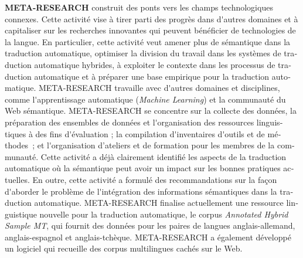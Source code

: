\begin{french}
\begin{multicols}{2}
\textbf{META-RESEARCH} construit des ponts vers les champs technologiques connexes. Cette activité vise à tirer parti des progrès dans d{\mbox '}autres domaines et à capitaliser sur les recherches innovantes qui peuvent bénéficier de technologies de la langue. En particulier, cette activité veut amener plus de sémantique dans la traduction automatique, optimiser la division du travail dans les systèmes de traduction automatique hybrides, à exploiter le contexte dans les processus de traduction automatique et à préparer une base empirique pour la traduction automatique. META-RESEARCH travaille avec d{\mbox '}autres domaines et disciplines, comme l{\mbox '}apprentissage automatique ({\it Machine Learning}) et la communauté du Web sémantique. META-RESEARCH se concentre sur la collecte des données, la préparation des ensembles de données et l{\mbox '}organisation des ressources linguistiques à des fins d{\mbox '}évaluation ; la compilation d{\mbox '}inventaires d{\mbox '}outils et de méthodes~; et l{\mbox '}organisation d'ateliers et de formation pour les membres de la communauté. Cette activité a déjà clairement identifié les aspects de la traduction automatique où la sémantique peut avoir un impact sur les bonnes pratiques actuelles. En outre, cette activité a formulé des recommandations sur la façon d{\mbox '}aborder le problème de l{\mbox '}intégration des informations sémantiques dans la traduction automatique. META-RESEARCH finalise actuellement une ressource linguistique nouvelle pour la traduction automatique, le corpus {\it Annotated Hybrid Sample MT}, qui fournit des données pour les paires de langues anglais-allemand, anglais-espagnol et anglais-tchèque. META-RESEARCH a également développé un logiciel qui recueille des corpus multilingues cachés sur le Web.
\end{multicols}

\end{french}


\cleardoublepage




